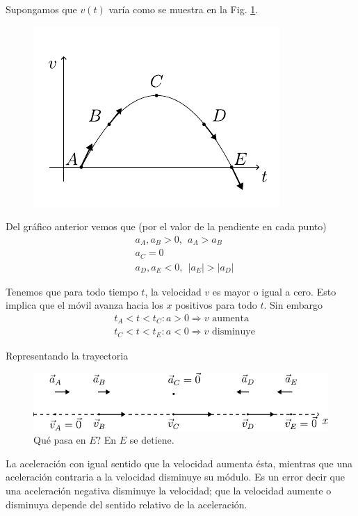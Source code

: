 \begin{example}
  Supongamos que $v(t)$ varía como se muestra en la Fig. \ref{fig:1-9}.
  \begin{figure}[H]
    \centering
    \includegraphics[]{images/f1-9.pdf}
    \caption{}
    \label{fig:1-9}
  \end{figure}

  Del gráfico anterior vemos que (por el valor de la pendiente en cada punto)
  \begin{align*}
    &a_{A},a_{B}>0, \ \ a_{A}> a_{B}\\
    &a_{C}=0 \\
    &a_{D},a_{E}<0, \ \ \left|a_{E}\right|>\left|a_{D}\right|    
  \end{align*}

  Tenemos que para todo tiempo $t$, la velocidad $v$ es mayor o igual a 
  cero. Esto implica que el móvil avanza hacia los $x$ positivos para todo $t$. Sin embargo
  \begin{align*}
    &t_{A}<t<t_{C}: a>0 \Longrightarrow v \text{ aumenta}\\
    &t_{C}<t<t_{E}: a<0 \Longrightarrow v \text{ disminuye}
  \end{align*}
  
  Representando la trayectoria
  \begin{figure}[H]
    \centering
    \includegraphics[]{images/f1-10.pdf}
    \caption{\textquestiondown Qué pasa en $E$? En $E$ se detiene.}
    \label{fig:1-10}
  \end{figure}
  
  La aceleración con igual sentido que la velocidad aumenta ésta, mientras que una aceleración contraria a la velocidad 
  disminuye su módulo. Es un error decir que una aceleración negativa disminuye la velocidad; que la velocidad aumente 
  o disminuya depende del sentido relativo de la aceleración.
  

\end{example}
